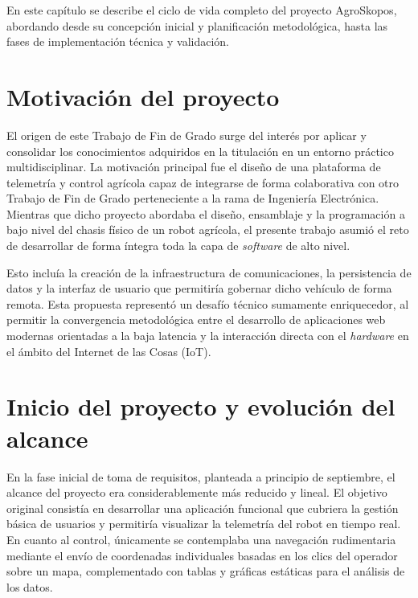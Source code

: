 
En este capítulo se describe el ciclo de vida completo del proyecto AgroSkopos, abordando desde su concepción inicial y planificación metodológica, hasta las fases de implementación técnica y validación. 

\section{Motivación del proyecto}

El origen de este Trabajo de Fin de Grado surge del interés por aplicar y consolidar los conocimientos adquiridos en la titulación en un entorno práctico multidisciplinar. La motivación principal fue el diseño de una plataforma de telemetría y control agrícola capaz de integrarse de forma colaborativa con otro Trabajo de Fin de Grado perteneciente a la rama de Ingeniería Electrónica. Mientras que dicho proyecto abordaba el diseño, ensamblaje y la programación a bajo nivel del chasis físico de un robot agrícola, el presente trabajo asumió el reto de desarrollar de forma íntegra toda la capa de \textit{software} de alto nivel. 

Esto incluía la creación de la infraestructura de comunicaciones, la persistencia de datos y la interfaz de usuario que permitiría gobernar dicho vehículo de forma remota. Esta propuesta representó un desafío técnico sumamente enriquecedor, al permitir la convergencia metodológica entre el desarrollo de aplicaciones web modernas orientadas a la baja latencia y la interacción directa con el \textit{hardware} en el ámbito del Internet de las Cosas (IoT).

\section{Inicio del proyecto y evolución del alcance}

En la fase inicial de toma de requisitos, planteada a principio de septiembre, el alcance del proyecto era considerablemente más reducido y lineal. El objetivo original consistía en desarrollar una aplicación funcional que cubriera la gestión básica de usuarios y permitiría visualizar la telemetría del robot en tiempo real. En cuanto al control, únicamente se contemplaba una navegación rudimentaria mediante el envío de coordenadas individuales basadas en los clics del operador sobre un mapa, complementado con tablas y gráficas estáticas para el análisis de los datos.

